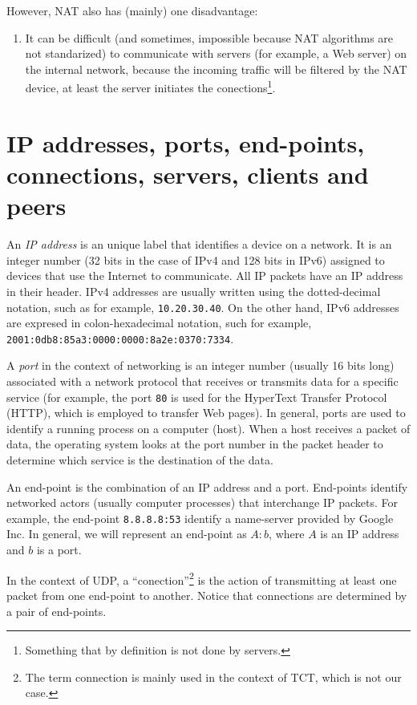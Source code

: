 However, NAT also has (mainly) one disadvantage:
\begin{enumerate}
\item It can be difficult (and sometimes, impossible because NAT
  algorithms are not standarized) to communicate with servers (for
  example, a Web server) on the internal network, because the incoming
  traffic will be filtered by the NAT device, at least the server
  initiates the conections\footnote{Something that by definition is
    not done by servers.}.
\end{enumerate}

\section{IP addresses, ports, end-points, connections, servers, clients and peers}

An \emph{IP address} is an unique label that identifies a device on a
network. It is an integer number (32 bits in the case of IPv4 and 128
bits in IPv6) assigned to devices that use the Internet to
communicate. All IP packets have an IP address in their header. IPv4
addresses are usually written using the dotted-decimal notation, such
as for example, \texttt{10.20.30.40}. On the other hand, IPv6
addresses are expresed in colon-hexadecimal notation, such for
example, \texttt{2001:0db8:85a3:0000:0000:8a2e:0370:7334}.

A \emph{port} in the context of networking is an integer number (usually 16
bits long) associated with a network protocol that receives or
transmits data for a specific service (for example, the port
\texttt{80} is used for the HyperText Transfer Protocol (HTTP), which
is employed to transfer Web pages). In general, ports are used to
identify a running process on a computer (host). When a host receives
a packet of data, the operating system looks at the port number in the
packet header to determine which service is the destination of the
data.

An end-point is the combination of an IP address and a
port. End-points identify networked actors (usually computer
processes) that interchange IP packets. For example, the end-point
\texttt{8.8.8.8:53} identify a name-server provided by Google Inc. In
general, we will represent an end-point as $A:b$, where $A$ is an
IP address and $b$ is a port.

In the context of UDP, a ``conection''\footnote{The term connection is
  mainly used in the context of TCT, which is not our case.} is the
action of transmitting at least one packet from one end-point to
another. Notice that connections are determined by a pair of
end-points.


